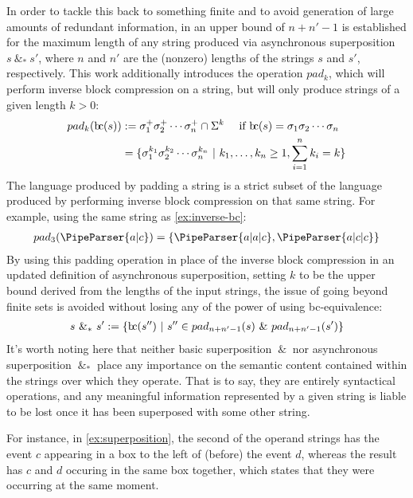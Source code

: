 \documentclass[a4paper,12pt,leqno]{article}
\newcommand{\bc}{{\rm b\!c}}
\newcommand{\vph}[1]{\vphantom{#1}}
\newcommand{\ebox}[1]{\fbox{$\vph{'(),}#1$}}
\renewcommand{\sp}{~\&~}
\newcommand{\spasync}{~\&_*~}
\newcommand{\EventString}[1]{
	\renewcommand*{\do}[1]{\ebox{##1}}%
	\PipeParser{#1}
}
\begin{document}
In order to tackle this back to something finite and to avoid generation of large amounts of redundant information, in \citet[p. 127]{woods2017towards} an upper bound of $n + n' - 1$ is established for the maximum length of any string produced via asynchronous superposition $s \spasync s'$, where $n$ and $n'$ are the (nonzero) lengths of the strings $s$ and $s'$, respectively. This work additionally introduces the operation $pad_k$, which will perform inverse block compression on a string, but will only produce strings of a given length $k > 0$:
\begin{align}\label{def:padk}
	pad_k(\bc(s)) &:= \sigma_1^+ \sigma_2^+ \cdots \sigma_n^+ \cap \Sigma^k ~~~ \mbox{ if } \bc(s) = \sigma_1 \sigma_2 \cdots \sigma_n\\
	&=\{\sigma_1^{k_1}\sigma_2^{k_2}\cdots\sigma_n^{k_n} ~|~ k_1,\ldots,k_n \ge 1, \sum_{i = 1}^{n}k_i = k  \}\notag
\end{align}
The language produced by padding a string is a strict subset of the language produced by performing inverse block compression on that same string. For example, using the same string as \cref{ex:inverse-bc}:
\begin{align}\label{ex:padk}
	pad_3(\EventString{a|c}) = \{\EventString{a|a|c}, \EventString{a|c|c}\}
\end{align}
By using this padding operation in place of the inverse block compression in an updated definition of asynchronous superposition, setting $k$ to be the upper bound derived from the lengths of the input strings, the issue of going beyond finite sets is avoided without losing any of the power of using \bc-equivalence:
\begin{align}\label{def:async-superposition}
	s \spasync s' := \{\bc(s'') ~|~ s'' \in pad_{n+n'-1}(s) \sp pad_{n+n'-1}(s')\}
\end{align}
It's worth noting here that neither basic superposition $\sp$ nor asynchronous superposition $\spasync$ place any importance on the semantic content contained within the strings over which they operate. That is to say, they are entirely syntactical operations, and any meaningful information represented by a given string is liable to be lost once it has been superposed with some other string.

For instance, in \cref{ex:superposition}, the second of the operand strings has the event $c$ appearing in a box to the left of (before) the event $d$, whereas the result has $c$ and $d$ occuring in the same box together, which states that they were occurring at the same moment.
\end{document}

